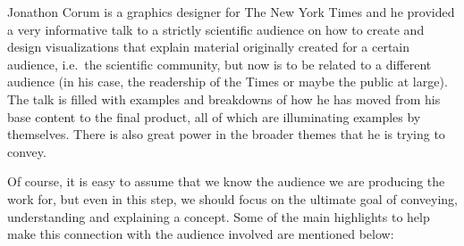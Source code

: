 \documentclass[]{book}
\theoremstyle{definition}
\theoremstyle{definition}
\theoremstyle{definition}
\theoremstyle{remark}
\begin{document}
Jonathon Corum is a graphics designer for The New York Times and he
provided a very informative talk to a strictly scientific audience on
how to create and design visualizations that explain material originally
created for a certain audience, i.e.~the scientific community, but now
is to be related to a different audience (in his case, the readership of
the Times or maybe the public at large). The talk is filled with
examples and breakdowns of how he has moved from his base content to the
final product, all of which are illuminating examples by themselves.
There is also great power in the broader themes that he is trying to
convey.

Of course, it is easy to assume that we know the audience we are
producing the work for, but even in this step, we should focus on the
ultimate goal of conveying, understanding and explaining a concept. Some
of the main highlights to help make this connection with the audience
involved are mentioned below:
\end{document}
